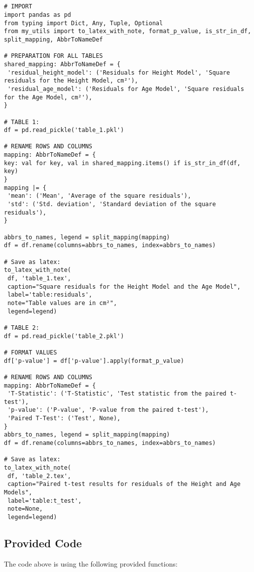 \documentclass[11pt]{article}
\begin{document}
\begin{verbatim}


# IMPORT
import pandas as pd
from typing import Dict, Any, Tuple, Optional
from my_utils import to_latex_with_note, format_p_value, is_str_in_df, split_mapping, AbbrToNameDef

# PREPARATION FOR ALL TABLES
shared_mapping: AbbrToNameDef = {
 'residual_height_model': ('Residuals for Height Model', 'Square residuals for the Height Model, cm²'),
 'residual_age_model': ('Residuals for Age Model', 'Square residuals for the Age Model, cm²'),
}

# TABLE 1:
df = pd.read_pickle('table_1.pkl')

# RENAME ROWS AND COLUMNS
mapping: AbbrToNameDef = {
key: val for key, val in shared_mapping.items() if is_str_in_df(df, key)
}
mapping |= {
 'mean': ('Mean', 'Average of the square residuals'),
 'std': ('Std. deviation', 'Standard deviation of the square residuals'),
}

abbrs_to_names, legend = split_mapping(mapping)
df = df.rename(columns=abbrs_to_names, index=abbrs_to_names)

# Save as latex:
to_latex_with_note(
 df, 'table_1.tex',
 caption="Square residuals for the Height Model and the Age Model",
 label='table:residuals',
 note="Table values are in cm²",
 legend=legend)

# TABLE 2:
df = pd.read_pickle('table_2.pkl')

# FORMAT VALUES
df['p-value'] = df['p-value'].apply(format_p_value)

# RENAME ROWS AND COLUMNS 
mapping: AbbrToNameDef = {
 'T-Statistic': ('T-Statistic', 'Test statistic from the paired t-test'),
 'p-value': ('P-value', 'P-value from the paired t-test'),
 'Paired T-Test': ('Test', None),
}
abbrs_to_names, legend = split_mapping(mapping)
df = df.rename(columns=abbrs_to_names, index=abbrs_to_names)

# Save as latex:
to_latex_with_note(
 df, 'table_2.tex',
 caption="Paired t-test results for residuals of the Height and Age Models", 
 label='table:t_test',
 note=None,
 legend=legend)

\end{verbatim}

\subsection{Provided Code}
The code above is using the following provided functions:
\end{document}
